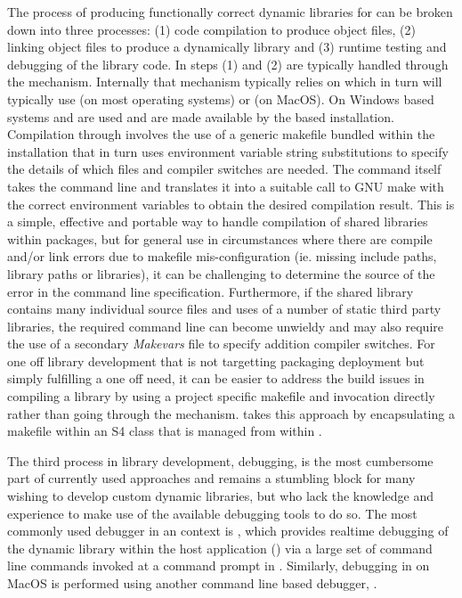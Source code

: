 The process of producing functionally correct dynamic libraries for  can be broken down into three processes: (1) code compilation to produce object files,
(2) linking object files to produce a dynamically library and (3) runtime testing and debugging of the library code. In  steps (1) and (2) 
are typically handled through the \citep{SHLIB} mechanism. Internally that mechanism typically relies on \citep{GnuMake} which 
in turn will typically use \citep{gcc} (on most operating systems) or \citep{LLVM} (on MacOS). On Windows based systems  and 
are used and are made available by the  based  installation\citep{UsingRtools}. Compilation through  
involves the use of a generic makefile bundled within the  installation that in turn uses environment variable string substitutions to specify the details 
of which files and compiler switches are needed. The command itself takes the command line and translates it into a suitable call to GNU make with the correct 
environment variables to obtain the desired compilation result. This is a simple, effective and portable way to handle compilation of shared 
libraries within  packages, but for general use in circumstances where there are compile and/or link errors due to makefile mis-configuration 
(ie. missing include paths, library paths or libraries), it can be challenging to determine the source of the error in the command line specification. Furthermore, 
if the shared library contains many individual source files and uses of a number of static third party libraries, the required command line can become 
unwieldy and may also require the use of a secondary \emph{Makevars} file to specify addition compiler switches. For one off library development that is not targetting
packaging deployment but simply fulfilling a one off need, it can be easier to address the build issues in compiling a library by using a project specific makefile 
and  invocation directly rather than going through the  mechanism.  takes this approach by encapsulating a makefile within 
an S4 class that is managed from within . 

The third process in library development, debugging, is the most cumbersome part of currently used approaches and remains a stumbling 
block for many wishing to develop custom dynamic libraries, but who lack the knowledge and experience to make use of the available debugging 
tools to do so. The most commonly used debugger in an  context is \citep{GDB}, which provides realtime debugging of the dynamic library within the
host application () via a large set of command line commands invoked at a command prompt in . Similarly, debugging in  on MacOS is performed using another 
command line based debugger, \citep{LLDB}. 

